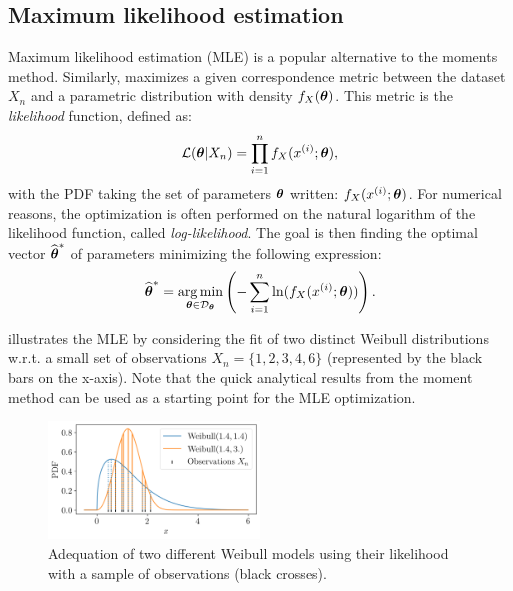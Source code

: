\subsection*{Maximum likelihood estimation}
Maximum likelihood estimation (MLE) is a popular alternative to the moments method. 
Similarly, maximizes a given correspondence metric between the dataset $X_n$ and a parametric distribution with density $f_X({\boldsymbol{\theta}})$.
This metric is the \textit{likelihood} function, defined as:
\begin{equation}
    \mathcal{L}({\boldsymbol{\theta}}|X_n) = \prod_{i=1}^{n} f_X(x^{(i)}; {\boldsymbol{\theta}}), 
\end{equation}
with the PDF taking the set of parameters ${\boldsymbol{\theta}}$ written: $f_X(x^{(i)}; {\boldsymbol{\theta}})$. 
For numerical reasons, the optimization is often performed on the natural logarithm of the likelihood function, called \textit{log-likelihood}. 
The goal is then finding the optimal vector $\widehat{{\boldsymbol{\theta}}}^*$ of parameters minimizing the following expression: 
\begin{equation}
    \widehat{{\boldsymbol{\theta}}}^* = \operatorname*{arg\,min}_{{\boldsymbol{\theta}} \in \mathcal{D}_{{\boldsymbol{\theta}}}} \left(-\sum_{i=1}^{n} \mathrm{ln}(f_X(x^{(i)}; {\boldsymbol{\theta}})) \right).
\end{equation}

 illustrates the MLE by considering the fit of two distinct Weibull distributions w.r.t. a small set of observations $X_n = \{1, 2, 3, 4, 6\}$ (represented by the black bars on the x-axis).
Note that the quick analytical results from the moment method can be used as a starting point for the MLE optimization. 


\begin{figure}[H]
    \centering
    \includegraphics[width=0.5\textwidth]{../numerical_experiments/chapter1/figures/MLE.png}
    \caption{Adequation of two different Weibull models using their likelihood with a sample of observations (black crosses).}
    \label{fig:MLE}
\end{figure}


